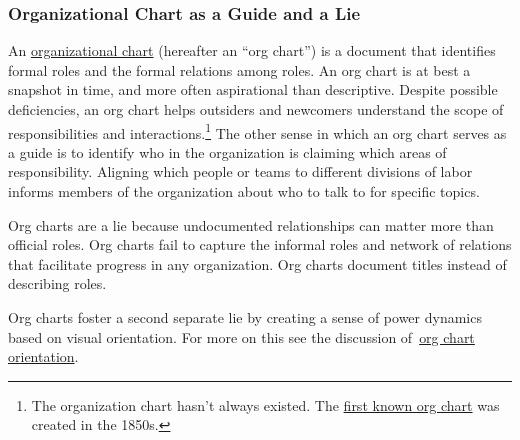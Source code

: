 \subsubsection*{Organizational Chart as a Guide and a Lie\label{sec:org-chart-as-guide-and-lie}}

An \href{https://en.wikipedia.org/wiki/Organizational_chart}{organizational chart} 
\iftoggle{WPinmargin}{\marginpar{$>$Wikipedia: Organizational chart}}{}
(hereafter an ``\gls{org chart}'') is a document that identifies formal roles and the formal relations among roles. An org chart is at best a snapshot in time, and more often aspirational than descriptive. Despite possible deficiencies, an org chart helps outsiders and newcomers understand the scope of responsibilities and interactions.\footnote{The organization chart hasn't always existed. The \href{https://en.wikipedia.org/wiki/George_Holt_Henshaw\%23First_organization_chart}{first known org chart} 
was created in the 1850s.} The other sense in which an org chart serves as a guide is to identify who in the organization is claiming which areas of responsibility. Aligning which people or teams to different divisions of labor informs members of the organization about who to talk to for specific topics.

Org charts are a lie because undocumented relationships can matter more than official roles. Org charts fail to capture the informal roles and network of relations that facilitate progress in any organization. Org charts document titles instead of describing roles.

Org charts foster a second separate lie by creating a sense of power dynamics based on visual orientation. For more on this see the discussion of~\hyperref[sec:org-chart-orientation]{org chart orientation}\iftoggle{haspagenumbers}{ on page~\pageref{sec:org-chart-orientation}}{}.
